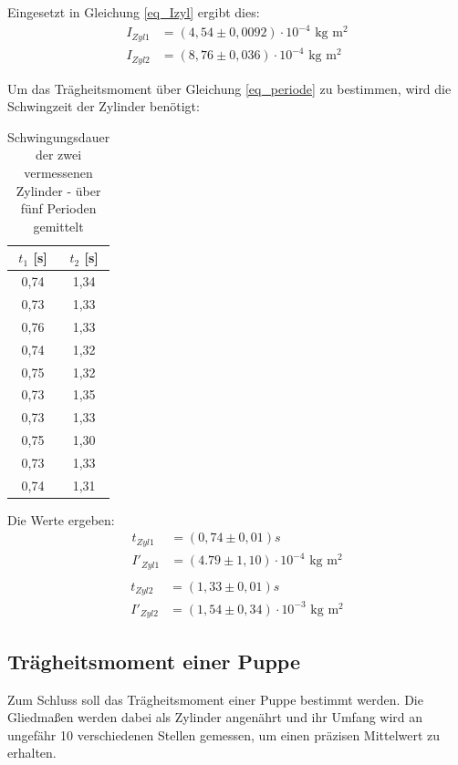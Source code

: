 Eingesetzt in Gleichung \eqref{eq_Izyl} ergibt dies:
\begin{align*}
I_{Zyl 1}&=(4,54\pm0,0092)\cdot10^{-4}\text{ kg m$^2$}\\
I_{Zyl 2}&=(8,76\pm0,036)\cdot10^{-4}\text{ kg m$^2$}
\end{align*}

Um das Trägheitsmoment über Gleichung \eqref{eq_periode} zu bestimmen,  wird die Schwingzeit der Zylinder benötigt:
\begin{table}[htbp]
\begin{tabular}{|c|c|}
\hline 
$t_1$ [s] & $t_2$ [s]\\ \hline
0,74&	1,34\\ \hline
0,73&	1,33\\ \hline
0,76&	1,33\\ \hline
0,74&	1,32\\ \hline
0,75&	1,32\\ \hline
0,73&	1,35\\ \hline
0,73&	1,33\\ \hline
0,75&	1,30\\ \hline
0,73&	1,33\\ \hline
0,74&	1,31\\ \hline
\end{tabular} 
\caption{Schwingungsdauer der zwei vermessenen Zylinder - über fünf Perioden \mbox{gemittelt}}
\end{table}

Die Werte ergeben:
\begin{align*}
t_{Zyl 1}&=(0,74 \pm 0,01)s\\
I'_{Zyl 1}&=(4.79\pm1,10)\cdot10^{-4}\text{ kg m$^2$}\\
\end{align*}
\begin{align*}
t_{Zyl 2}&=(1,33 \pm  0,01)s\\ 
I'_{Zyl 2}&=(1,54\pm0,34)\cdot10^{-3}\text{ kg m$^2$}
\end{align*}

\subsection{Trägheitsmoment einer Puppe}
Zum Schluss soll das Trägheitsmoment einer Puppe bestimmt werden. Die Gliedmaßen werden dabei als Zylinder angenährt und ihr Umfang wird an ungefähr 10 verschiedenen Stellen gemessen, um einen präzisen Mittelwert zu erhalten.

